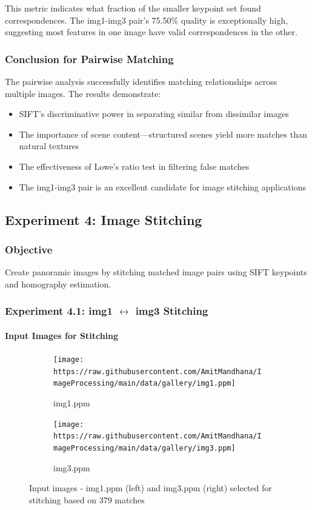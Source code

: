 \documentclass[12pt,a4paper]{article}
\begin{document}
This metric indicates what fraction of the smaller keypoint set found correspondences. The img1-img3 pair's 75.50\% quality is exceptionally high, suggesting most features in one image have valid correspondences in the other.

\subsubsection{Conclusion for Pairwise Matching}
The pairwise analysis successfully identifies matching relationships across multiple images. The results demonstrate:
\begin{itemize}
    \item SIFT's discriminative power in separating similar from dissimilar images
    \item The importance of scene content—structured scenes yield more matches than natural textures
    \item The effectiveness of Lowe's ratio test in filtering false matches
    \item The img1-img3 pair is an excellent candidate for image stitching applications
\end{itemize}

\subsection{Experiment 4: Image Stitching}

\subsubsection{Objective}
Create panoramic images by stitching matched image pairs using SIFT keypoints and homography estimation.

\subsubsection{Experiment 4.1: img1 $\leftrightarrow$ img3 Stitching}

\paragraph{Input Images for Stitching}

\begin{figure}[H]
\centering
\begin{subfigure}{0.45\textwidth}
\texttt{[image: https://raw.githubusercontent.com/AmitMandhana/ImageProcessing/main/data/gallery/img1.ppm]}
\caption{img1.ppm}
\end{subfigure}
\hfill
\begin{subfigure}{0.45\textwidth}
\texttt{[image: https://raw.githubusercontent.com/AmitMandhana/ImageProcessing/main/data/gallery/img3.ppm]}
\caption{img3.ppm}
\end{subfigure}
\caption{Input images - img1.ppm (left) and img3.ppm (right) selected for stitching based on 379 matches}
\end{figure}
\end{document}
